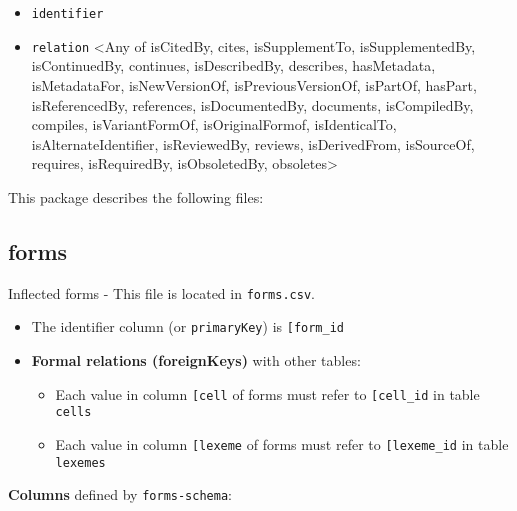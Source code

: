 \begin{itemize}
\begin{itemize}
    \begin{itemize}
    \tightlist
    \item
      \texttt{identifier}
    \item
      \texttt{relation} \textless Any of isCitedBy, cites,
      isSupplementTo, isSupplementedBy, isContinuedBy, continues,
      isDescribedBy, describes, hasMetadata, isMetadataFor,
      isNewVersionOf, isPreviousVersionOf, isPartOf, hasPart,
      isReferencedBy, references, isDocumentedBy, documents,
      isCompiledBy, compiles, isVariantFormOf, isOriginalFormof,
      isIdenticalTo, isAlternateIdentifier, isReviewedBy, reviews,
      isDerivedFrom, isSourceOf, requires, isRequiredBy, isObsoletedBy,
      obsoletes\textgreater{}
    \end{itemize}
  \end{itemize}
\end{itemize}

This package describes the following files:

\hypertarget{forms}{%
\subsection{\texorpdfstring{\textbf{forms}}{forms}}\label{forms}}

Inflected forms - This file is located in \texttt{forms.csv}.

\begin{itemize}
\item
  The identifier column (or \texttt{primaryKey}) is
  \texttt{{[}\textquotesingle{}form\_id\textquotesingle{}{]}}
\item
  \textbf{Formal relations (foreignKeys)} with other tables:

  \begin{itemize}
  \tightlist
  \item
    Each value in column
    \texttt{{[}\textquotesingle{}cell\textquotesingle{}{]}} of forms
    must refer to
    \texttt{{[}\textquotesingle{}cell\_id\textquotesingle{}{]}} in table
    \texttt{cells}
  \item
    Each value in column
    \texttt{{[}\textquotesingle{}lexeme\textquotesingle{}{]}} of forms
    must refer to
    \texttt{{[}\textquotesingle{}lexeme\_id\textquotesingle{}{]}} in
    table \texttt{lexemes}
  \end{itemize}
\end{itemize}

\textbf{Columns} defined by \texttt{forms-schema}:


